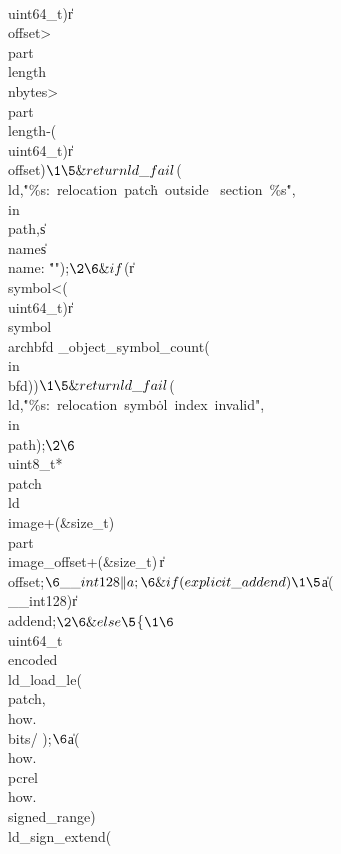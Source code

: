 \\{uint64\_t})\|r\MG\\{offset}>\\{part}\MG\\{length}\V\\{nbytes}>\\{part}\MG%
\\{length}-(\\{uint64\_t})\|r\MG\\{offset}){}$\1\5
\&{return} \\{ld\_fail}${}(\\{ld},\.{"\%s:\ relocation\ patc}\)\.{h\ outside%
\ section\ \%s}\)\.{"},\\{in}\MG\\{path},\|s\MG\\{name}\?\|s\MG\\{name}:%
\.{""});{}$\2\6
\&{if} ${}(\|r\MG\\{symbol}<\V(\\{uint64\_t})\|r\MG\\{symbol}\G\\{archbfd%
\_object\_symbol\_count}(\\{in}\MG\\{bfd})){}$\1\5
\&{return} \\{ld\_fail}${}(\\{ld},\.{"\%s:\ relocation\ symb}\)\.{ol\ index\
invalid"},\\{in}\MG\\{path});{}$\2\6
${}\\{uint8\_t}*\\{patch}\K\\{ld}\MG\\{image}+(\&{size\_t})\,\\{part}\MG%
\\{image\_offset}+(\&{size\_t})\,\|r\MG\\{offset};{}$\6
\\{\_\_int128}\|a;\6
\&{if} (\\{explicit\_addend})\1\5
${}\|a\K(\\{\_\_int128})\|r\MG\\{addend};{}$\2\6
\&{else}\5
${}\{{}$\1\6
${}\\{uint64\_t}\\{encoded}\K\\{ld\_load\_le}(\\{patch},\\{how}.\\{bits}/%
\T{8});{}$\6
${}\|a\K(\\{how}.\\{pcrel}\V\\{how}.\\{signed\_range})\?\\{ld\_sign\_extend}(%
